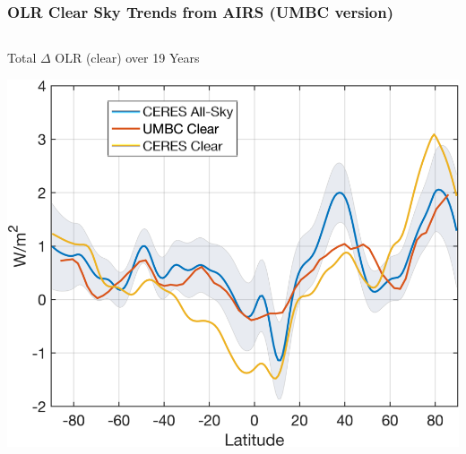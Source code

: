 \documentclass[10pt,t]{beamer}
\begin{document}
\begin{frame}
\frametitle{OLR Clear Sky Trends from AIRS (UMBC version)}  
\vspace{-0.1in}

\begin{columns}
\begin{column}{0.5\columnwidth}
\begin{block}{\small Total \(\Delta\) OLR (clear) over 19 Years}
\vspace{-0.1in}
\begin{center}
\includegraphics[width=\linewidth]{SunClimate2022/ceres_clear_and_cld_19yrold_vs_umbc.png}
\end{center}
\end{block}
\end{column}


\end{columns}
\end{frame}
\end{document}
